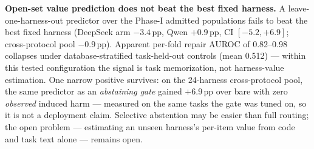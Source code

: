 \textbf{Open-set value prediction does not beat the best fixed harness.} A
leave-one-harness-out predictor over the Phase-I admitted populations fails to beat
the best fixed harness (DeepSeek arm $-3.4$\,pp, Qwen $+0.9$\,pp, CI
$[-5.2, +6.9]$; cross-protocol pool $-0.9$\,pp). Apparent per-fold repair AUROC of
0.82--0.98 collapses under database-stratified task-held-out controls (mean 0.512)
--- within this tested configuration the signal is task memorization, not
harness-value estimation. One narrow positive survives: on the 24-harness
cross-protocol pool, the same predictor as an \emph{abstaining gate} gained
$+6.9$\,pp over bare with zero \emph{observed} induced harm --- measured on the
same tasks the gate was tuned on, so it is not a deployment claim. Selective
abstention may be easier than full routing; the open problem --- estimating an
unseen harness's per-item value from code and task text alone --- remains open.
